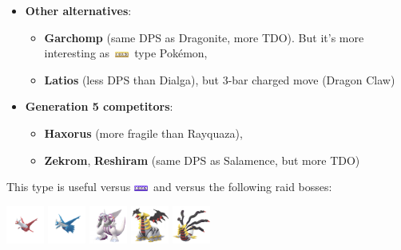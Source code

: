 \documentclass[12pt]{beamer}
\newcommand{\dragonfull}{\includegraphics[height=0.2cm]{../../images/type/full/Dragon.png}}
\newcommand{\groundfull}{\includegraphics[height=0.2cm]{../../images/type/full/Ground.png}}
\begin{document}
\begin{frame}
\begin{footnotesize}
\begin{block}{}
\begin{center}
\begin{itemize}
\item \textbf{Other alternatives}: 
\begin{itemize}
  \item \scriptsize \textbf{Garchomp} (same DPS as Dragonite, more TDO). But it's more interesting as~\groundfull~type Pok\'emon,
  \item \scriptsize \textbf{Latios} (less DPS than Dialga), but 3-bar charged move (Dragon Claw)
\end{itemize}
\item \textbf{Generation 5 competitors}: 
\begin{itemize}
  \item \scriptsize  \textbf{Haxorus} (more fragile than Rayquaza),
  \item \scriptsize \textbf{Zekrom}, \textbf{Reshiram} (same DPS as Salamence, but more TDO)
\end{itemize}
\end{itemize}
\end{center}
\end{block}

\begin{block}{}\begin{center}
This type is useful versus \dragonfull~and versus the following raid bosses:

    \includegraphics[width=1.25cm]{../../images/pokemon/latias.png}
    \includegraphics[width=1.25cm]{../../images/pokemon/latios.png}
    \includegraphics[width=1.25cm]{../../images/pokemon/palkia.png}\quad
    \includegraphics[width=1.25cm]{../../images/pokemon/giratina_a.png}\quad
    \includegraphics[width=1.25cm]{../../images/pokemon/giratina_o.png}
\end{center}
\end{block}

\end{footnotesize}
\end{frame}
\end{document}
